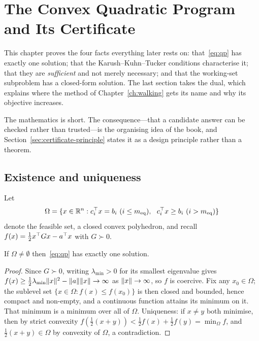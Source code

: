 \chapter{The Convex Quadratic Program and Its Certificate}
\label{ch:certificate}

This chapter proves the four facts everything later rests on: that~\eqref{eq:qp}
has exactly one solution; that the Karush--Kuhn--Tucker conditions characterise
it; that they are \emph{sufficient} and not merely necessary; and that the
working-set subproblem has a closed-form solution. The last section takes the
dual, which explains where the method of Chapter~\ref{ch:walking} gets its name
and why its objective increases.

The mathematics is short. The consequence---that a candidate answer can be
checked rather than trusted---is the organising idea of the book, and
Section~\ref{sec:certificate-principle} states it as a design principle rather
than a theorem.

\section{Existence and uniqueness}

Let
\[
  \Omega = \{x \in \mathbb{R}^n : c_i^{\top} x = b_i \ (i \le m_{\mathrm{eq}}),\ \
                          c_i^{\top} x \ge b_i \ (i > m_{\mathrm{eq}})\}
\]
denote the feasible set, a closed convex polyhedron, and recall
$f(x) = \tfrac12 x^{\top} G x - a^{\top} x$ with $G \succ 0$.

\begin{proposition}
\label{prop:existunique}
If $\Omega \ne \emptyset$ then~\eqref{eq:qp} has exactly one solution.
\end{proposition}

\begin{proof}
Since $G \succ 0$, writing $\lambda_{\min} > 0$ for its smallest eigenvalue gives
$f(x) \ge \tfrac12\lambda_{\min}\lVert x \rVert^2 - \lVert a \rVert\lVert x \rVert \to \infty$ as
$\lVert x \rVert\to\infty$, so $f$ is coercive. Fix any $x_0 \in \Omega$; the sublevel set
$\{x \in \Omega : f(x) \le f(x_0)\}$ is then closed and bounded, hence compact and
non-empty, and a continuous function attains its minimum on it. That minimum is a
minimum over all of $\Omega$. Uniqueness: if $x \ne y$ both minimise, then by
strict convexity $f(\tfrac12(x+y)) < \tfrac12 f(x) + \tfrac12 f(y) = \min_\Omega f$,
and $\tfrac12(x+y) \in \Omega$ by convexity of $\Omega$, a contradiction.
\end{proof}

